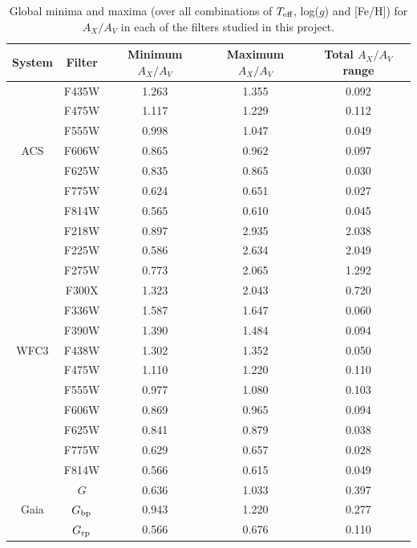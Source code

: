 \documentclass[12pt, a4paper]{report}
\begin{document}

\begin{table}
\begin{center}
\begin{tabular}{ccccc}
\hline
System & Filter & Minimum $A_{X}/A_{V}$ & Maximum $A_{X}/A_{V}$ & Total $A_{X}/A_{V}$ range \\
\hline
& F435W & 1.263 & 1.355 & 0.092 \\
& F475W & 1.117 & 1.229 & 0.112 \\
& F555W & 0.998 & 1.047 & 0.049 \\
ACS & F606W & 0.865 & 0.962 & 0.097 \\
& F625W & 0.835 & 0.865 & 0.030 \\
& F775W & 0.624 & 0.651 & 0.027 \\
& F814W & 0.565 & 0.610 & 0.045 \\
\hline
& F218W & 0.897 & 2.935 & 2.038 \\
& F225W & 0.586 & 2.634 & 2.049 \\
& F275W & 0.773 & 2.065 & 1.292 \\
& F300X & 1.323 & 2.043 & 0.720 \\
& F336W & 1.587 & 1.647 & 0.060 \\
& F390W & 1.390 & 1.484 & 0.094 \\
WFC3 & F438W & 1.302 & 1.352 & 0.050 \\
& F475W & 1.110 & 1.220 & 0.110 \\
& F555W & 0.977 & 1.080 & 0.103 \\
& F606W & 0.869 & 0.965 & 0.094 \\
& F625W & 0.841 & 0.879 & 0.038 \\
& F775W & 0.629 & 0.657 & 0.028 \\
& F814W & 0.566 & 0.615 & 0.049 \\
\hline
& $G$ & 0.636 & 1.033 & 0.397 \\
Gaia & $G_{\textnormal{bp}}$ & 0.943 & 1.220 & 0.277 \\
& $G_{\textnormal{rp}}$ & 0.566 & 0.676 & 0.110 \\
\hline

\end{tabular}
\caption{Global minima and maxima (over all combinations of $T_{\textnormal{eff}}$, log($g$) and [Fe/H]) for $A_{X}/A_{V}$ in each of the filters studied in this project.}
\label{filter_AxAv_ranges}
\end{center}
\end{table}
\end{document}
